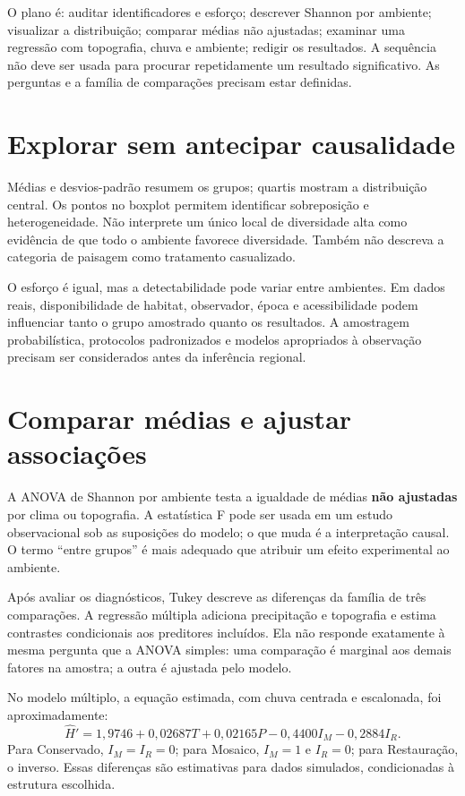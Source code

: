 O plano é: auditar identificadores e esforço; descrever Shannon por ambiente; visualizar a distribuição; comparar médias não ajustadas; examinar uma regressão com topografia, chuva e ambiente; redigir os resultados. A sequência não deve ser usada para procurar repetidamente um resultado significativo. As perguntas e a família de comparações precisam estar definidas.

\section{Explorar sem antecipar causalidade}
Médias e desvios-padrão resumem os grupos; quartis mostram a distribuição central. Os pontos no boxplot permitem identificar sobreposição e heterogeneidade. Não interprete um único local de diversidade alta como evidência de que todo o ambiente favorece diversidade. Também não descreva a categoria de paisagem como tratamento casualizado.


O esforço é igual, mas a detectabilidade pode variar entre ambientes. Em dados reais, disponibilidade de habitat, observador, época e acessibilidade podem influenciar tanto o grupo amostrado quanto os resultados. A amostragem probabilística, protocolos padronizados e modelos apropriados à observação precisam ser considerados antes da inferência regional.

\section{Comparar médias e ajustar associações}
A ANOVA de Shannon por ambiente testa a igualdade de médias \textbf{não ajustadas} por clima ou topografia. A estatística F pode ser usada em um estudo observacional sob as suposições do modelo; o que muda é a interpretação causal. O termo ``entre grupos'' é mais adequado que atribuir um efeito experimental ao ambiente.

Após avaliar os diagnósticos, Tukey descreve as diferenças da família de três comparações. A regressão múltipla adiciona precipitação e topografia e estima contrastes condicionais aos preditores incluídos. Ela não responde exatamente à mesma pergunta que a ANOVA simples: uma comparação é marginal aos demais fatores na amostra; a outra é ajustada pelo modelo.

\begin{exemplo}
No modelo múltiplo, a equação estimada, com chuva centrada e escalonada, foi aproximadamente:
\[
\widehat H'=1{,}9746+0{,}02687T+0{,}02165P
-0{,}4400I_M-0{,}2884I_R.
\]
Para Conservado, $I_M=I_R=0$; para Mosaico, $I_M=1$ e $I_R=0$; para Restauração, o inverso. Essas diferenças são estimativas para dados simulados, condicionadas à estrutura escolhida.
\end{exemplo}

